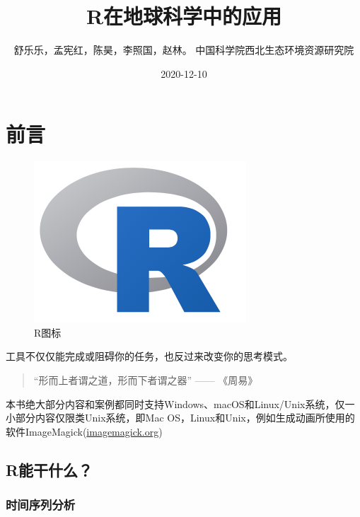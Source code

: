\documentclass[]{scrbook}
\title{R在地球科学中的应用}
\author{舒乐乐，孟宪红，陈昊，李照国，赵林。 中国科学院西北生态环境资源研究院}
\date{2020-12-10}
\begin{document}
\maketitle

{
\hypersetup{linkcolor=black}
\setcounter{tocdepth}{1}
\tableofcontents
}
\hypertarget{index}{%
\chapter*{前言}\label{index}}

\begin{figure}
\centering
\includegraphics{Fig/R.png}
\caption{R图标}
\end{figure}

工具不仅仅能完成或阻碍你的任务，也反过来改变你的思考模式。

\begin{quote}
``形而上者谓之道，形而下者谓之器'' ------ 《周易》
\end{quote}

本书绝大部分内容和案例都同时支持Windows、macOS和Linux/Unix系统，仅一小部分内容仅限类Unix系统，即Mac OS，Linux和Unix，例如生成动画所使用的软件ImageMagick(\url{imagemagick.org})

\hypertarget{rux80fdux5e72ux4ec0ux4e48}{%
\section*{R能干什么？}\label{rux80fdux5e72ux4ec0ux4e48}}

\hypertarget{ux65f6ux95f4ux5e8fux5217ux5206ux6790}{%
\subsection*{时间序列分析}\label{ux65f6ux95f4ux5e8fux5217ux5206ux6790}}
\end{document}
